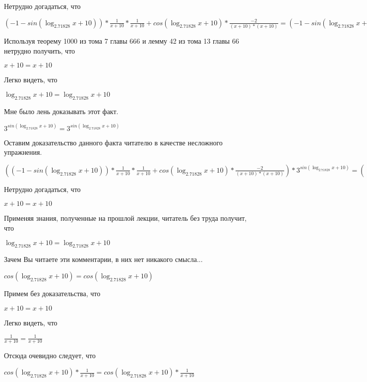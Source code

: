 \documentclass[12pt,a4paper,fleqn]{article}
\theoremstyle{definition}
\begin{document}
Нетрудно догадаться, что 

$( -1  - sin(\log_{ 2.71828 }{ x  +  10 })) * \frac{ 1 }{ x  +  10 }
 * \frac{ 1 }{ x  +  10 }
 + cos(\log_{ 2.71828 }{ x  +  10 }) * \frac{ -2 }{( x  +  10 ) * ( x  +  10 )}
 = ( -1  - sin(\log_{ 2.71828 }{ x  +  10 })) * \frac{ 1 }{ x  +  10 }
 * \frac{ 1 }{ x  +  10 }
 + cos(\log_{ 2.71828 }{ x  +  10 }) * \frac{ -2 }{( x  +  10 ) * ( x  +  10 )}
$

Используя теорему 1000 из тома 7 главы 666 и лемму 42 из тома 13 главы 66 нетрудно получить, что 

$ x  +  10  =  x  +  10 $

Легко видеть, что 

$\log_{ 2.71828 }{ x  +  10 } = \log_{ 2.71828 }{ x  +  10 }$

Мне было лень доказывать этот факт.

${ 3 }^{sin(\log_{ 2.71828 }{ x  +  10 })} = { 3 }^{sin(\log_{ 2.71828 }{ x  +  10 })}$

Оставим доказательство данного факта читателю в качестве несложного упражнения. 

$(( -1  - sin(\log_{ 2.71828 }{ x  +  10 })) * \frac{ 1 }{ x  +  10 }
 * \frac{ 1 }{ x  +  10 }
 + cos(\log_{ 2.71828 }{ x  +  10 }) * \frac{ -2 }{( x  +  10 ) * ( x  +  10 )}
) * { 3 }^{sin(\log_{ 2.71828 }{ x  +  10 })} = (( -1  - sin(\log_{ 2.71828 }{ x  +  10 })) * \frac{ 1 }{ x  +  10 }
 * \frac{ 1 }{ x  +  10 }
 + cos(\log_{ 2.71828 }{ x  +  10 }) * \frac{ -2 }{( x  +  10 ) * ( x  +  10 )}
) * { 3 }^{sin(\log_{ 2.71828 }{ x  +  10 })}$

Нетрудно догадаться, что 

$ x  +  10  =  x  +  10 $

Применяя знания, полученные на прошлой лекции, читатель без труда получит, что 

$\log_{ 2.71828 }{ x  +  10 } = \log_{ 2.71828 }{ x  +  10 }$

Зачем Вы читаете эти комментарии, в них нет никакого смысла... 

$cos(\log_{ 2.71828 }{ x  +  10 }) = cos(\log_{ 2.71828 }{ x  +  10 })$

Примем без доказательства, что 

$ x  +  10  =  x  +  10 $

Легко видеть, что 

$\frac{ 1 }{ x  +  10 }
 = \frac{ 1 }{ x  +  10 }
$

Отсюда очевидно следует, что 

$cos(\log_{ 2.71828 }{ x  +  10 }) * \frac{ 1 }{ x  +  10 }
 = cos(\log_{ 2.71828 }{ x  +  10 }) * \frac{ 1 }{ x  +  10 }
$
\end{document}
